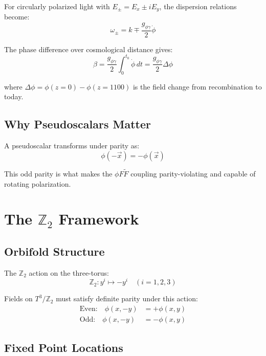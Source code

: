 \documentclass[12pt,a4paper]{article}
\begin{document}
For circularly polarized light with $E_\pm = E_x \pm i E_y$, the dispersion relations become:
\begin{equation}
\omega_\pm = k \mp \frac{g_{\phi\gamma}}{2} \dot{\phi}
\end{equation}

The phase difference over cosmological distance gives:
\begin{equation}
\beta = \frac{g_{\phi\gamma}}{2} \int_0^{t_0} \dot{\phi} \, dt = \frac{g_{\phi\gamma}}{2} \Delta\phi
\end{equation}

where $\Delta\phi = \phi(z=0) - \phi(z=1100)$ is the field change from recombination to today.

\subsection{Why Pseudoscalars Matter}

A pseudoscalar transforms under parity as:
\begin{equation}
\phi(-\vec{x}) = -\phi(\vec{x})
\end{equation}

This odd parity is what makes the $\phi F\tilde{F}$ coupling parity-violating and capable of rotating polarization.

\section{The $\mathbb{Z}_2$ Framework}

\subsection{Orbifold Structure}

The $\mathbb{Z}_2$ action on the three-torus:
\begin{equation}
\mathbb{Z}_2: y^i \mapsto -y^i \quad (i = 1, 2, 3)
\end{equation}

Fields on $T^3/\mathbb{Z}_2$ must satisfy definite parity under this action:
\begin{align}
\text{Even:} \quad \phi(x, -y) &= +\phi(x, y) \\
\text{Odd:} \quad \phi(x, -y) &= -\phi(x, y)
\end{align}

\subsection{Fixed Point Locations}
\end{document}
